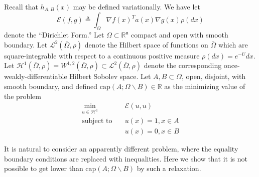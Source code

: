 \documentclass[english, aip, jcp, priprint, graphicx,floatfix]{revtex4-1}
\theoremstyle{plain}
\theoremstyle{definition}
\theoremstyle{plain}
\newcommand{\dimension}{{\mathfrak{n}}}
\newcommand{\capac}[2]{\mathrm{cap}\left(#1;#2\right)}
\begin{document}
\label{sec:inequalityboundaryvar}

Recall that $h_{A,B}(x)$ may be defined variationally.  We have let 
%
\[
\mathscr{E}(f,g)\triangleq \int_\Omega \nabla f(x)^T a(x) \nabla g(x) \rho(dx)
\]
%
denote the ``Dirichlet Form.''  Let $\Omega \subset \mathbb{R}^\dimension$ compact and open with smooth boundary.  Let $\mathscr L^2(\bar \Omega,\rho)$ denote the Hilbert space of functions on $\bar \Omega$ which are square-integrable with respect to a continuous positive measure $\rho(dx)=e^{-U}dx$.  Let $\mathcal{H}^1(\bar \Omega,\rho)=W^{1,2}(\bar \Omega,\rho) \subset \mathscr{L}^2(\bar \Omega,\rho)$ denote the corresponding once-weakly-differentiable Hilbert Sobolev space.  Let $A,B\subset \Omega$, open, disjoint, with smooth boundary, and defined $\capac{A}{\Omega \backslash B} \in \mathbb{R}$ as the minimizing value of the problem
    \begin{align*}
    \min_{u \in \mathcal H^1} \quad & \mathscr{E}(u,u) \\
    \mbox{subject to} \quad & u(x)=1,x\in A \\
     & u(x)=0,x\in B
    \end{align*}

It is natural to consider an apparently different problem, where the equality boundary conditions are replaced with inequalities.  Here we show that it is not possible to get lower than $\capac{A}{\Omega \backslash B}$ by such a relaxation.
\end{document}
